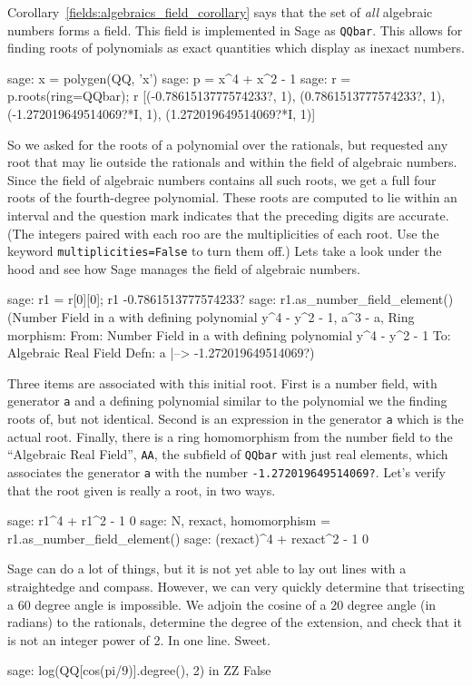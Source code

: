 %
%
Corollary~\ref{fields:algebraics_field_corollary} says that the set of \emph{all} algebraic numbers forms a field.  This field is implemented in Sage as \verb?QQbar?.  This allows for finding roots of polynomials as exact quantities which display as inexact numbers.
%
\begin{sageexample}
sage: x = polygen(QQ, 'x')
sage: p = x^4 + x^2 - 1
sage: r = p.roots(ring=QQbar); r
[(-0.7861513777574233?,  1), (0.7861513777574233?,  1),
 (-1.272019649514069?*I, 1), (1.272019649514069?*I, 1)]
\end{sageexample}
%
So we asked for the roots of a polynomial over the rationals, but requested any root that may lie outside the rationals and within the field of algebraic numbers.  Since the field of algebraic numbers contains all such roots, we get a full four roots of the fourth-degree polynomial.  These roots are computed to lie within an interval and the question mark indicates that the preceding digits are accurate.  (The integers paired with each roo are the multiplicities of each root. Use the keyword \verb?multiplicities=False? to turn them off.)  Lets take a look under the hood and see how Sage manages the field of algebraic numbers.
%
\begin{sageexample}
sage: r1 = r[0][0]; r1
-0.7861513777574233?
sage: r1.as_number_field_element()
(Number Field in a with defining polynomial y^4 - y^2 - 1,
 a^3 - a,
 Ring morphism:
   From: Number Field in a with defining polynomial y^4 - y^2 - 1
   To:   Algebraic Real Field
   Defn: a |--> -1.272019649514069?)
\end{sageexample}
%
Three items are associated with this initial root.  First is a number field, with generator \verb?a? and a defining polynomial similar to the polynomial we the finding roots of, but not identical.  Second is an expression in the generator \verb?a? which is the actual root.  Finally, there is a ring homomorphism from the number field to the ``Algebraic Real Field'', \verb?AA?, the subfield of \verb?QQbar? with just real elements, which associates the generator \verb?a? with the number \verb!-1.272019649514069?!.  Let's verify that the root given is really a root, in two ways.
%
\begin{sageexample}
sage: r1^4 + r1^2 - 1
0
sage: N, rexact, homomorphism = r1.as_number_field_element()
sage: (rexact)^4 + rexact^2 - 1
0
\end{sageexample}
%
%
Sage can do a lot of things, but it is not yet able to lay out lines with a straightedge and compass.  However, we can very quickly determine that trisecting a 60 degree angle is impossible.  We adjoin the cosine of a 20 degree angle (in radians) to the rationals, determine the degree of the extension, and check that it is not an integer power of 2.  In one line.  Sweet.
%
\begin{sageexample}
sage: log(QQ[cos(pi/9)].degree(), 2) in ZZ
False
\end{sageexample}
%
